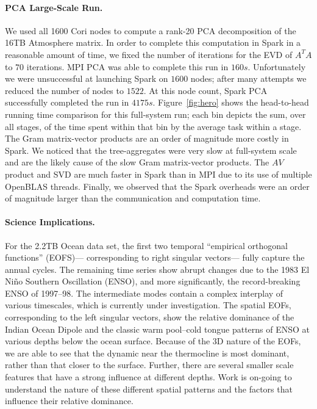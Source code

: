 \paragraph{PCA Large-Scale Run.}
We used all 1600 Cori nodes to compute a rank-20 PCA decomposition of the 16TB Atmosphere matrix. In order to complete this computation in Spark in a reasonable amount of time, we fixed the number of iterations for the EVD of $A^TA$ to $70$ iterations. MPI PCA was able to complete this run in $160s$. Unfortunately we were unsuccessful at launching Spark on $1600$ nodes; after many attempts we reduced the number of nodes to $1522$. At this node count, Spark PCA successfully completed the run in $4175s$. Figure~\ref{fig:hero} shows the head-to-head running time comparison for this full-system run; each bin depicts the sum, over all stages, of the time spent within that bin by the average task within a stage. The Gram matrix-vector products are an order of magnitude more costly in Spark. We noticed that the tree-aggregates were very slow at full-system scale and are the likely cause of the slow Gram matrix-vector products. The $AV$ product and SVD are much faster in Spark than in MPI due to its use of multiple OpenBLAS threads. Finally, we observed that the Spark overheads were an order of magnitude larger than the communication and computation time.

\paragraph{Science Implications.}
For the 2.2TB Ocean data set, the first two temporal ``empirical orthogonal functions'' (EOFS)--- corresponding to right singular vectors--- fully capture the annual cycles. The remaining time series show abrupt changes due to the 1983 El Ni\~no Southern Oscillation (ENSO), and more significantly, the record-breaking ENSO of 1997--98. The intermediate modes contain a complex interplay of various timescales, which is currently under investigation. The spatial EOFs, corresponding to the left singular vectors, show the relative dominance of the Indian Ocean Dipole and the classic warm pool--cold tongue patterns of ENSO at various depths below the ocean surface. Because of the 3D nature of the EOFs, we are able to see that the dynamic near the thermocline is most dominant, rather than that closer to the surface. Further, there are several smaller scale features that have a strong influence at different depths. Work is on-going to understand the nature of these different spatial patterns and the factors that influence their relative dominance.
 

